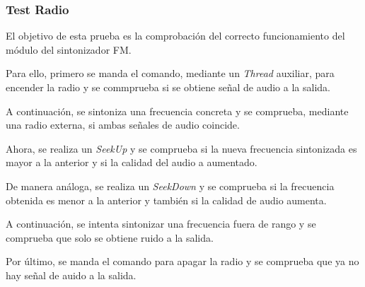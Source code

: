 \subsubsection{Test Radio}

El objetivo de esta prueba es la comprobación del correcto funcionamiento del módulo del sintonizador FM.

Para ello, primero se manda el comando, mediante un \textit{Thread} auxiliar, para encender la radio y se commprueba si se obtiene señal de audio a la salida.

A continuación, se sintoniza una frecuencia concreta y se comprueba, mediante una radio externa, si ambas señales de audio coincide.

Ahora, se realiza un \textit{SeekUp} y se comprueba si la nueva frecuencia sintonizada es mayor a la anterior y si la calidad del audio a aumentado.

De manera análoga, se realiza un \textit{SeekDown} y se comprueba si la frecuencia obtenida es menor a la anterior y también si la calidad de audio aumenta.

A continuación, se intenta sintonizar una frecuencia fuera de rango y se comprueba que solo se obtiene ruido a la salida.

Por último, se manda el comando para apagar la radio y se comprueba que ya no hay señal de auido a la salida.